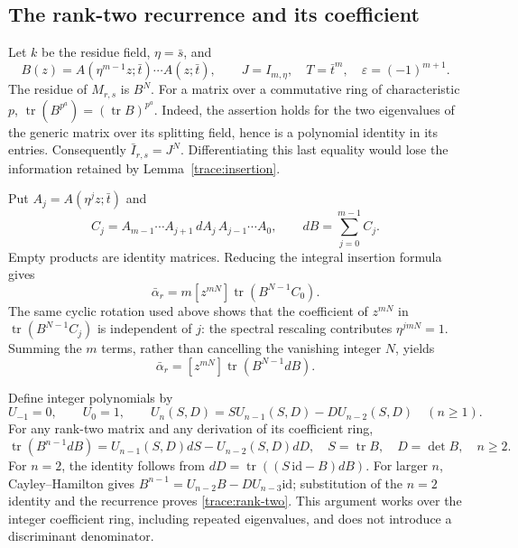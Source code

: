 \subsection{The rank-two recurrence and its coefficient}

Let $k$ be the residue field, $\eta=\bar s$, and
\[
 B(z)=A(\eta^{m-1}z;\bar t)\cdots A(z;\bar t),\qquad
 J=I_{m,\eta},\quad T=\bar t^m,\quad
 \varepsilon=(-1)^{m+1}.
\]
The residue of $M_{r,s}$ is $B^N$. For a matrix over a commutative ring of
characteristic $p$, $\operatorname{tr}(B^{p^a})=(\operatorname{tr}B)^{p^a}$.
Indeed, the assertion holds for the two eigenvalues of the generic matrix
over its splitting field, hence is a polynomial identity in its entries.
Consequently $\bar I_{r,s}=J^N$. Differentiating this last equality would
lose the information retained by Lemma~\ref{trace:insertion}.

Put $A_j=A(\eta^jz;\bar t)$ and
\[
 C_j=A_{m-1}\cdots A_{j+1}\,dA_j\,A_{j-1}\cdots A_0,
 \qquad dB=\sum_{j=0}^{m-1}C_j.
\]
Empty products are identity matrices. Reducing the integral insertion
formula gives
\[
 \bar\alpha_r=m[z^{mN}]\operatorname{tr}(B^{N-1}C_0).
\]
The same cyclic rotation used above shows that the coefficient of
$z^{mN}$ in $\operatorname{tr}(B^{N-1}C_j)$ is independent of $j$:
the spectral rescaling contributes $\eta^{jmN}=1$. Summing the $m$
terms, rather than cancelling the vanishing integer $N$, yields
\begin{equation}
 \bar\alpha_r=[z^{mN}]\operatorname{tr}(B^{N-1}dB).
 \label{trace:reduced-insertion}
\end{equation}

Define integer polynomials by
\begin{equation}
 U_{-1}=0,\qquad U_0=1,\qquad
 U_n(S,D)=S U_{n-1}(S,D)-D U_{n-2}(S,D)\quad(n\ge1).
 \label{trace:U}
\end{equation}
For any rank-two matrix and any derivation of its coefficient ring,
\begin{equation}
 \operatorname{tr}(B^{n-1}dB)
 =U_{n-1}(S,D)dS-U_{n-2}(S,D)dD,
 \quad S=\operatorname{tr}B,\quad D=\det B,
 \quad n\ge2.
 \label{trace:rank-two}
\end{equation}
For $n=2$, the identity follows from
$dD=\operatorname{tr}((S\,\mathrm{id}-B)dB)$.
For larger $n$, Cayley--Hamilton gives
$B^{n-1}=U_{n-2}B-DU_{n-3}\mathrm{id}$; substitution of the $n=2$
identity and the recurrence proves \eqref{trace:rank-two}.
This argument works over the integer coefficient ring, including repeated
eigenvalues, and does not introduce a discriminant denominator.

